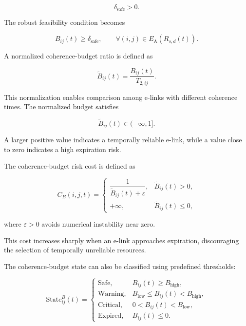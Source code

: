 \begin{equation}
    \delta_{\mathrm{safe}}>0.
\end{equation}

The robust feasibility condition becomes

\begin{equation}
    B_{ij}(t)
    \geq
    \delta_{\mathrm{safe}},
    \qquad
    \forall (i,j)
    \in
    E_{\mathrm{A}}(R_{s,d}(t)).
\end{equation}

A normalized coherence-budget ratio is defined as

\begin{equation}
    \widetilde{B}_{ij}(t)
    =
    \frac{
    B_{ij}(t)
    }{
    T_{2,ij}
    }.
\end{equation}

This normalization enables comparison among e-links with different coherence times. The normalized budget satisfies

\begin{equation}
    \widetilde{B}_{ij}(t)
    \in
    (-\infty,1].
\end{equation}

A larger positive value indicates a temporally reliable e-link, while a value close to zero indicates a high expiration risk.

The coherence-budget risk cost is defined as

\begin{equation}
    C_B(i,j,t)
    =
    \begin{cases}
        \dfrac{1}{
        \widetilde{B}_{ij}(t)+\varepsilon
        },
        &
        \widetilde{B}_{ij}(t)>0,
        \\[12pt]
        +\infty,
        &
        \widetilde{B}_{ij}(t)\leq 0,
    \end{cases}
\end{equation}

where $\varepsilon>0$ avoids numerical instability near zero.

This cost increases sharply when an e-link approaches expiration, discouraging the selection of temporally unreliable resources.

The coherence-budget state can also be classified using predefined thresholds:

\begin{equation}
    \mathrm{State}_{ij}^{B}(t)
    =
    \begin{cases}
        \mathrm{Safe},
        &
        B_{ij}(t)\geq B_{\mathrm{high}},
        \\
        \mathrm{Warning},
        &
        B_{\mathrm{low}}
        \leq B_{ij}(t)<B_{\mathrm{high}},
        \\
        \mathrm{Critical},
        &
        0<B_{ij}(t)<B_{\mathrm{low}},
        \\
        \mathrm{Expired},
        &
        B_{ij}(t)\leq 0.
    \end{cases}
\end{equation}

